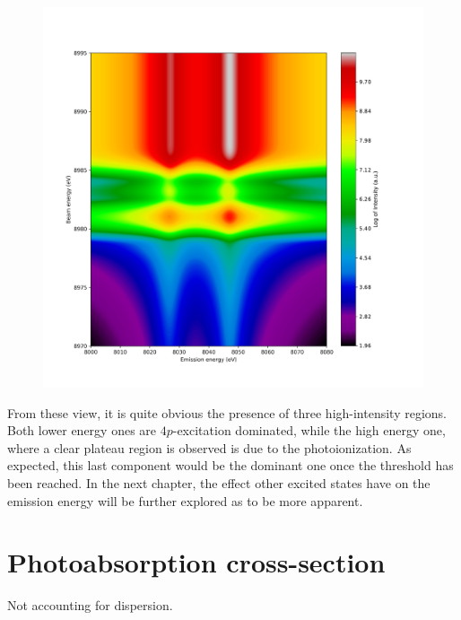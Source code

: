 \begin{figure}[h!]
    \centering
    \includegraphics[width=.7\linewidth]{Chapters/Figures/Chapter4/all_log.pdf}
\end{figure}

From these view, it is quite obvious the presence of three high-intensity regions. Both lower energy ones are $4p$-excitation dominated, while the high energy one, where a clear plateau region is observed is due to the photoionization. As expected, this last component would be the dominant one once the threshold has been reached. In the next chapter, the effect other excited states have on the emission energy will be further explored as to be more apparent.


\section{Photoabsorption cross-section}
Not accounting for dispersion.